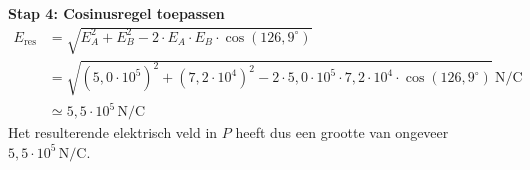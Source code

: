 \documentclass{ximera}
\begin{document}
\begin{exercise}
\begin{solution}
        \textbf{Stap 4: Cosinusregel toepassen}
        \begin{align*}
            E_{\text{res}} &= \sqrt{E_A^{2} + E_B^{2} - 2 \cdot E_A \cdot E_B \cdot \cos(126{,}9^\circ)} \\
                            &= \sqrt{(5{,}0 \cdot 10^{5})^{2} + (7{,}2 \cdot 10^{4})^{2} - 2 \cdot 5{,}0 \cdot 10^{5} \cdot 7{,}2 \cdot 10^{4} \cdot \cos(126{,}9^\circ)} \, \mathrm{N/C} \\
                            &\simeq \boxed{5{,}5 \cdot 10^{5} \, \mathrm{N/C}}
        \end{align*}
        Het resulterende elektrisch veld in $P$ heeft dus een grootte van ongeveer $5{,}5 \cdot 10^{5} \, \mathrm{N/C}$.
    \end{solution}
\end{exercise}
\end{document}
